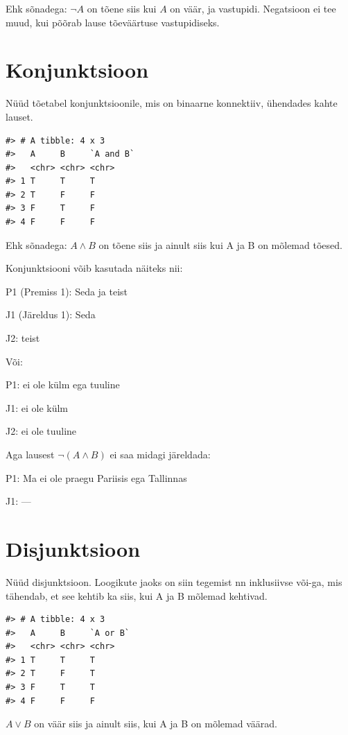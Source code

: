 \documentclass[]{book}
\begin{document}
Ehk sõnadega: \(\neg A\) on tõene siis kui \(A\) on väär, ja vastupidi. Negatsioon ei tee muud, kui põõrab lause tõeväärtuse vastupidiseks.

\hypertarget{konjunktsioon}{%
\section{Konjunktsioon}\label{konjunktsioon}}

Nüüd tõetabel konjunktsioonile, mis on binaarne konnektiiv, ühendades kahte lauset.

\begin{verbatim}
#> # A tibble: 4 x 3
#>   A     B     `A and B`
#>   <chr> <chr> <chr>    
#> 1 T     T     T        
#> 2 T     F     F        
#> 3 F     T     F        
#> 4 F     F     F
\end{verbatim}

Ehk sõnadega: \(A \land B\) on tõene siis ja ainult siis kui A ja B on mõlemad tõesed.

Konjunktsiooni võib kasutada näiteks nii:

P1 (Premiss 1): Seda ja teist

J1 (Järeldus 1): Seda

J2: teist

Või:

P1: ei ole külm ega tuuline

J1: ei ole külm

J2: ei ole tuuline

Aga lausest \(\neg (A \land B)\) ei saa midagi järeldada:

P1: Ma ei ole praegu Pariisis ega Tallinnas

J1: ---

\hypertarget{disjunktsioon}{%
\section{Disjunktsioon}\label{disjunktsioon}}

Nüüd disjunktsioon. Loogikute jaoks on siin tegemist nn inklusiivse või-ga, mis tähendab, et see kehtib ka siis, kui A ja B mõlemad kehtivad.

\begin{verbatim}
#> # A tibble: 4 x 3
#>   A     B     `A or B`
#>   <chr> <chr> <chr>   
#> 1 T     T     T       
#> 2 T     F     T       
#> 3 F     T     T       
#> 4 F     F     F
\end{verbatim}

\(A \lor B\) on väär siis ja ainult siis, kui A ja B on mõlemad väärad.
\end{document}

